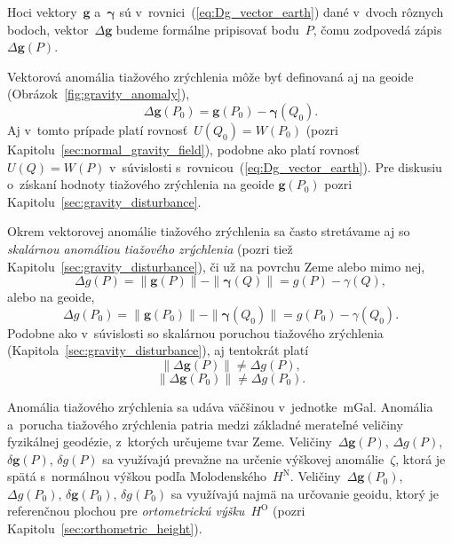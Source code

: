 \documentclass[a4paper, 12pt]{book}
\let\vec\mathbf
\begin{document}
Hoci vektory~$\vec g$ a~$\boldsymbol\gamma$ sú 
v~rovnici~(\ref{eq:Dg_vector_earth}) dané v~dvoch rôznych bodoch, 
vektor~$\Delta \vec g$ budeme formálne pripisovať bodu~$P$, čomu zodpovedá 
zápis~$\Delta \vec g(P)$.

Vektorová anomália tiažového zrýchlenia môže byť definovaná aj na geoide 
(Obrázok~\ref{fig:gravity_anomaly}),
%
\begin{equation}
\label{eq:Dg_vector_geoid}
\Delta \vec g(P_0) = \vec g(P_0) - \boldsymbol\gamma(Q_0){.}
\end{equation}
%
Aj v~tomto prípade platí rovnosť~$U(Q_0) = W(P_0)$ (pozri 
Kapitolu~\ref{sec:normal_gravity_field}), podobne ako platí rovnosť $U(Q) 
= W(P)$ v~súvislosti s~rovnicou~(\ref{eq:Dg_vector_earth}).  Pre diskusiu 
o~získaní hodnoty tiažového zrýchlenia na geoide $\vec g(P_0)$ pozri 
Kapitolu~\ref{sec:gravity_disturbance}.

Okrem vektorovej anomálie tiažového zrýchlenia sa často stretávame aj so 
\emph{skalárnou anomáliou tiažového zrýchlenia} (pozri tiež 
Kapitolu~\ref{sec:gravity_disturbance}), či už na povrchu Zeme alebo mimo nej,
%
\begin{equation}
\label{eq:Dg_scalar_earth}
\Delta g(P) = \| \vec g(P) \| - \| \boldsymbol \gamma(Q) \| = g(P) 
- \gamma(Q){,}
\end{equation}
%
alebo na geoide,
%
\begin{equation}
\label{eq:Dg_scalar_geoid}
\Delta g(P_0) = \| \vec g(P_0) \| - \| \boldsymbol \gamma(Q_0) \| = g(P_0) 
- \gamma(Q_0){.}
\end{equation}
%
Podobne ako v~súvislosti so skalárnou poruchou tiažového zrýchlenia 
(Kapitola~\ref{sec:gravity_disturbance}), aj tentokrát platí
%
\begin{equation}
\| \Delta \vec g(P) \| \neq \Delta g(P){,}
\end{equation}
%
\begin{equation}
\| \Delta \vec g(P_0) \| \neq \Delta g(P_0){.}
\end{equation}

Anomália tiažového zrýchlenia sa udáva väčšinou v~jednotke~mGal.  Anomália 
a~porucha tiažového zrýchlenia patria medzi základné merateľné veličiny 
fyzikálnej geodézie, z~ktorých určujeme tvar Zeme.  Veličiny~$\Delta \vec 
g(P)$, $\Delta g(P)$, $\delta \vec g(P)$, $\delta g(P)$ sa využívajú prevažne 
na určenie výškovej anomálie~$\zeta$, ktorá je spätá s~normálnou výškou podľa 
Molodenského~$H^\mathrm{N}$.  Veličiny~$\Delta \vec g(P_0)$, $\Delta g(P_0)$, 
$\delta \vec g(P_0)$, $\delta g(P_0)$ sa využívajú najmä na určovanie geoidu, 
ktorý je referenčnou plochou pre \emph{ortometrickú výšku}~$H^\mathrm{O}$ 
(pozri Kapitolu~\ref{sec:orthometric_height}).
\end{document}
